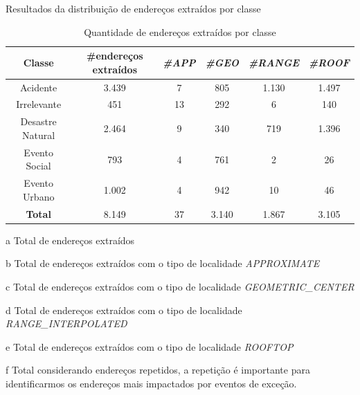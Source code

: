 \documentclass{beamer}
\begin{document}
\begin{frame}{Resultados da distribuição de endereços extraídos por classe}
\begin{table}[!htb]
\centering
\caption {Quantidade de endereços extraídos por classe}
\label {tab:qtdExtractedAddresses}
\begin{adjustbox}{max height=10mm, width=4in}
\begin{threeparttable}
\begin{tabular}{c|c|c|c|c|c}
\toprule
\textbf{Classe} & \textbf{\#endereços extraídos\tnote{a}} & \textbf{\textit{\#APP\tnote{b}}} & \textbf{\textit{\#GEO\tnote{c}}} & \textbf{\textit{\#RANGE\tnote{d}}} & \textbf{\textit{\#ROOF\tnote{e}}} \\
\midrule
Acidente & 3.439 & 7 & 805 & 1.130 & 1.497 \\
\hline
Irrelevante & 451 & 13 & 292 & 6 & 140 \\
\hline
Desastre Natural & 2.464 & 9 & 340 & 719 & 1.396 \\
\hline
Evento Social & 793 & 4 & 761 & 2 & 26 \\
\hline
Evento Urbano & 1.002 & 4 & 942 & 10 & 46 \\
\midrule
\midrule
\textbf{Total} & 8.149 & 37 & 3.140 & 1.867 & 3.105 \\
\bottomrule
\end{tabular}
\begin{tablenotes}
\item[a] Total de endereços extraídos
\item[b] Total de endereços extraídos com o tipo de localidade \textit{APPROXIMATE}
\item[c] Total de endereços extraídos com o tipo de localidade \textit{GEOMETRIC\_CENTER}
\item[d] Total de endereços extraídos com o tipo de localidade \textit{RANGE\_INTERPOLATED}
\item[e] Total de endereços extraídos com o tipo de localidade \textit{ROOFTOP}
\item[f] Total considerando endereços repetidos, a repetição é importante para identificarmos os endereços mais impactados por eventos de exceção.
\end{tablenotes}
\end{threeparttable}
\end{adjustbox}
\end{table}
\end{frame}
\end{document}
